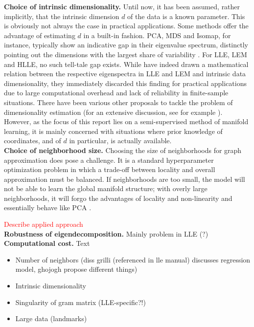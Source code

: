 \textbf{Choice of intrinsic dimensionality.} 
Until now, it has been assumed, rather implicitly, that the intrinsic dimension 
$d$ of the data is a known parameter.
This is obviously not always the case in practical applications.
Some methods offer the advantage of estimating $d$ in a built-in fashion. 
PCA, MDS and Isomap, for instance, typically show an indicative gap in their 
eigenvalue spectrum, distinctly pointing out the dimensions with the largest 
share of variability \citep{sauletal2006}.
For LLE, LEM and HLLE, no such tell-tale gap exists.
While \citet{shasaul2005} have indeed drawn a mathematical relation between the 
respective eigenspectra in LLE and LEM and intrinsic data dimensionality, they 
immediately discarded this finding for practical applications due to large 
computational overhead and lack of reliability in finite-sample situations.
There have been various other proposals to tackle the problem of dimensionality 
estimation (for an extensive discussion, see for example 
\citet{disswissel2017}).
However, as the focus of this report lies on a semi-supervised method of 
manifold learning, it is mainly concerned with situations where prior knowledge 
of coordinates, and of $d$ in particular, is actually available.
\\

\textbf{Choice of neighborhood size.} Choosing the size of neighborhoods for 
graph approximation does pose a challenge.
It is a standard hyperparameter optimization problem in which a trade-off 
between locality and overall approximation must be balanced.
If neighborhoods are too small, the model will not be able to learn the global 
manifold structure; with overly large neighborhoods, it will forgo the 
advantages of locality and non-linearity and essentially behave like PCA 
\citep{deridderduin2002}.

\textcolor{red}{Describe applied approach}
\\

\textbf{Robustness of eigendecomposition.} Mainly problem in LLE (?)
\\

\textbf{Computational cost.} Text
\\

\begin{itemize}
  \item Number of neighbors (diss grilli (referenced in lle manual) discusses 
  regression model, ghojogh propose different things)
  \item Intrinsic dimensionality
  \item Singularity of gram matrix (LLE-specific?!)
  \item Large data (landmarks)
\end{itemize}

